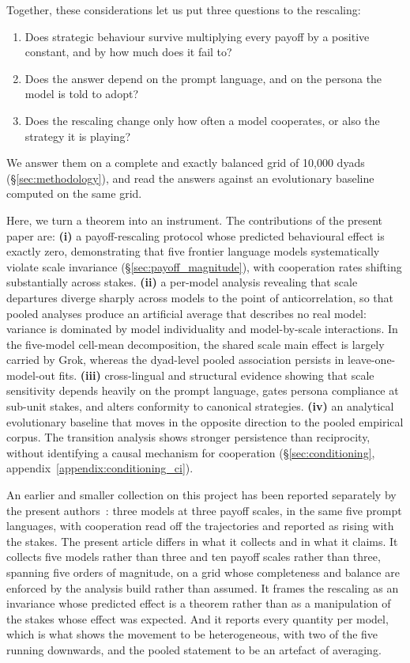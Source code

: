 \documentclass[openacc]{rsproca_new}
\begin{document}
Together, these considerations let us put three questions to the rescaling:
\begin{enumerate}[(1)]
\item Does strategic behaviour survive multiplying every payoff by a positive
      constant, and by how much does it fail to?
\item Does the answer depend on the prompt language, and on the persona the
      model is told to adopt?
\item Does the rescaling change only how often a model cooperates, or also the
      strategy it is playing?
\end{enumerate}
We answer them on a complete and exactly balanced grid of 10{,}000 dyads
(\S\ref{sec:methodology}), and read the answers against an evolutionary
baseline computed on the same grid.

Here, we turn a theorem into an instrument. The contributions of the present
paper are: \textbf{(i)} a payoff-rescaling protocol whose predicted behavioural
effect is exactly zero, demonstrating that five frontier language models
systematically violate scale invariance (\S\ref{sec:payoff_magnitude}), with
cooperation rates shifting substantially across stakes. \textbf{(ii)} a
per-model analysis revealing that scale departures diverge sharply across
models to the point of anticorrelation, so that pooled analyses produce
an artificial average that describes no real model: variance is dominated by
model individuality and model-by-scale interactions. In the five-model
cell-mean decomposition, the shared scale main effect is largely carried by
Grok, whereas the dyad-level pooled association persists in leave-one-model-out
fits. \textbf{(iii)} cross-lingual and structural evidence showing that scale
sensitivity depends heavily on the prompt language, gates persona compliance
at sub-unit stakes, and alters conformity to canonical strategies.
\textbf{(iv)} an analytical evolutionary baseline that moves in the
opposite direction to the pooled empirical corpus. The transition analysis
shows stronger persistence than reciprocity, without identifying a causal
mechanism for cooperation (\S\ref{sec:conditioning}, appendix~\ref{appendix:conditioning_ci}).

An earlier and smaller collection on this project has been reported separately
by the present authors~\cite{selfpreprint2026scaling}: three models at three
payoff scales, in the same five prompt languages, with cooperation read off the
trajectories and reported as rising with the stakes. The present article
differs in what it collects and in what it claims. It collects five models
rather than three and ten payoff scales rather than three, spanning five orders
of magnitude, on a grid whose completeness and balance are enforced by the
analysis build rather than assumed. It frames the rescaling as an invariance
whose predicted effect is a theorem rather than as a manipulation of the stakes
whose effect was expected. And it reports every quantity per model, which is
what shows the movement to be heterogeneous, with two of the five running
downwards, and the pooled statement to be an artefact of averaging.
\end{document}
